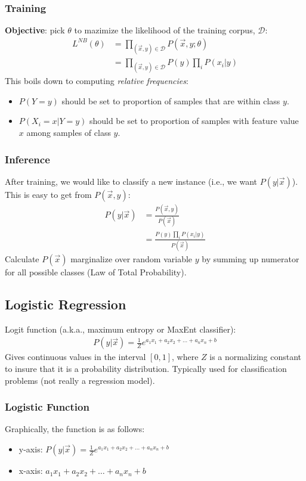 \documentclass{article}
\begin{document}
\subsubsection{Training}
\textbf{Objective}: pick $\theta$ to mazimize the likelihood of the training corpus, $\mathcal{D}$:
\begin{align}
    L^{NB}(\theta) &= \prod_{(\vec{x},y) \in \mathcal{D}}P(\vec{x}, y; \theta)\\
    &= \prod_{(\vec{x},y) \in \mathcal{D}}P(y) \prod_i P(x_i | y)
\end{align}
This boils down to computing \textit{relative frequencies}:
\begin{itemize}
    \item $P(Y = y)$ should be set to proportion of samples that are within class $y$.
    \item $P(X_i = x | Y = y)$ should be set to proportion of samples with feature value $x$ among samples of class $y$.
\end{itemize}
\subsubsection{Inference}
After training, we would like to classify a new instance (i.e., we want $P(y | \vec{x})$). This is easy to get from $P(\vec{x}, y)$:
\begin{align}
    P(y | \vec{x}) &= \frac{P(\vec{x}, y)}{P(\vec{x})}\\
    &= \frac{P(y)\prod_i P(x_i|y)}{P(\vec{x})}
\end{align}
Calculate $P(\vec{x})$ marginalize over random variable $y$ by summing up numerator for all possible classes (Law of Total Probability).

\subsection{Logistic Regression}
Logit function (a.k.a., maximum entropy or MaxEnt classifier):
\begin{align}
    P(y|\vec{x}) = \frac{1}{Z}e^{a_1x_1 + a_2x_2 + \ldots + a_nx_n + b}
\end{align}
Gives continuous values in the interval $[0,1]$, where $Z$ is a normalizing constant to insure that it is a probability distribution. Typically used for classification problems (not really a regression model).
\subsubsection{Logistic Function}
Graphically, the function is as follows:
\begin{itemize}
    \item y-axis: $P(y|\vec{x}) = \frac{1}{Z}e^{a_1x_1 + a_2x_2 + \ldots + a_nx_n + b}$
    \item x-axis: $a_1x_1 + a_2x_2 + \ldots + a_nx_n + b$
\end{itemize}
\end{document}
